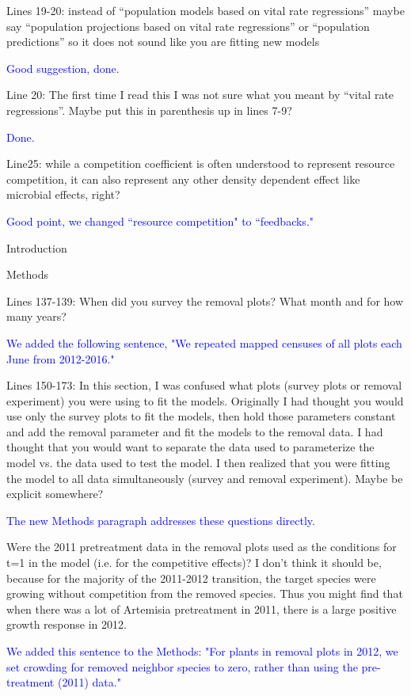 \documentclass[12pt]{article}
\newcommand{\response}{\textcolor{blue}}
\begin{document}
Lines 19-20: instead of “population models based on vital rate regressions” maybe say “population projections based on vital rate regressions” or “population predictions” so it does not sound like you are fitting new models

\response{Good suggestion, done.}

Line 20: The first time I read this I was not sure what you meant by “vital rate regressions”. Maybe put this in parenthesis up in lines 7-9?

\response{Done.}

Line25: while a competition coefficient is often understood to represent resource competition, it can also represent any other density dependent effect like microbial effects, right?

\response{Good point, we changed ``resource competition" to ``feedbacks."}

Introduction

Methods

Lines 137-139:  When did you survey the removal plots? What month and for how many years? 

\response{We added the following sentence, "We repeated mapped censuses of all plots each June from 2012-2016."}

Lines 150-173: In this section, I was confused what plots (survey plots or removal experiment) you were using to fit the models. Originally I had thought you would use only the survey plots to fit the models, then hold those parameters constant and add the removal parameter and fit the models to the removal data. I had thought that you would want to separate the data used to parameterize the model vs. the data used to test the model. I then realized that you were fitting the model to all data simultaneously (survey and removal experiment). Maybe be explicit somewhere? 

\response{The new Methods paragraph addresses these questions directly.}

Were the 2011 pretreatment data in the removal plots used as the conditions for t=1 in the model (i.e. for the competitive effects)? I don’t think it should be, because for the majority of the 2011-2012 transition, the target species were growing without competition from the removed species. Thus you might find that when there was a lot of Artemisia pretreatment in 2011, there is a large positive growth response in 2012.

\response{We added this sentence to the Methods: "For plants in removal plots in 2012, we set crowding for removed neighbor species to zero, rather than using the pre-treatment (2011) data."}
\end{document}
